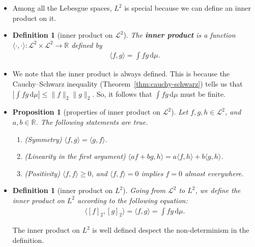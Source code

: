 \documentclass[10pt]{article}
\newtheorem{definition}[lemma]{Definition}
\newtheorem{proposition}[lemma]{Proposition}
\numberwithin{lemma}{section}
\newcommand{\dee}{\mathrm{d}}
\newcommand{\mcal}[1]{\mathcal{#1}}
\newcommand{\Real}{\mathbb{R}}
\begin{document}
\begin{itemize}
  \item Among all the Lebesgue spaces, $L^2$ is special because we can define an inner product on it.
  
  \item \begin{definition}[inner product on $\mcal{L}^2$]
    The {\bf inner product} is a function $\langle \cdot, \cdot \rangle : \mcal{L}^2 \times \mcal{L}^2 \rightarrow \Real$ defined by
    \begin{align*}
      \langle f, g \rangle = \int fg\, \dee\mu. 
    \end{align*}
  \end{definition}

  \item We note that the inner product is always defined. This is because the Cauchy--Schwarz inequality (Theorem~\ref{thm:cauchy-schwarz}) tells us that $| \int fg\, \dee\mu| \leq \| f \|_2 \| g \|_2$. So, it follows that $\int fg\, \dee\mu$ must be finite.
  
  \item \begin{proposition}[properties of inner product on $\mcal{L}^2$]
    Let $f,g,h \in \mcal{L}^2$, and $a,b \in \Real$. The following statements are true.
    \begin{enumerate}
      \item (Symmetry) $\langle f, g \rangle = \langle g, f \rangle$.
      \item (Linearity in the first argument) $\langle af + bg, h \rangle = a\langle f, h \rangle + b\langle g, h \rangle$.
      \item (Positivity) $\langle f, f \rangle \geq 0$, and $\langle f, f \rangle = 0$ implies $f = 0$ almost everywhere.
    \end{enumerate}
  \end{proposition}

  \item \begin{definition}[inner product on $L^2$]
    Going from $\mcal{L}^2$ to $L^2$, we define the inner product on $L^2$ according to the following equation:
    \begin{align*}
      \langle [f]_2, [g]_2 \rangle = \langle f, g \rangle = \int fg\, \dee\mu.
    \end{align*} 
  \end{definition}
  The inner product on $L^2$ is well defined despect the non-determinism in the definition.


\end{itemize}
\end{document}
